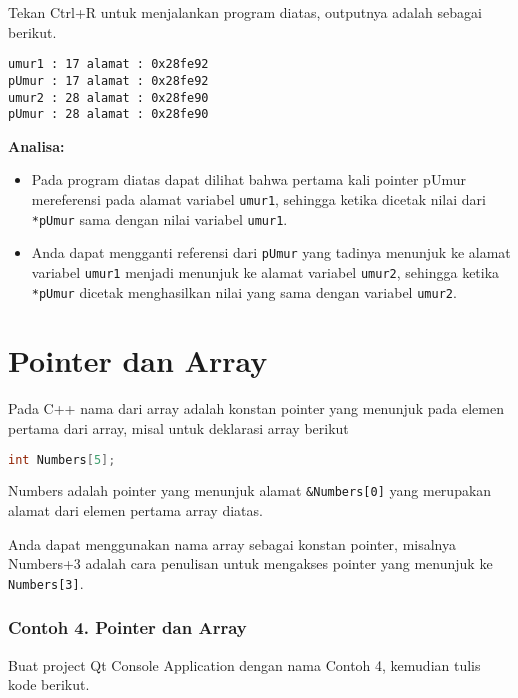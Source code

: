 Tekan Ctrl+R untuk menjalankan program diatas, outputnya adalah sebagai
berikut.

\begin{verbatim}
umur1 : 17 alamat : 0x28fe92
pUmur : 17 alamat : 0x28fe92
umur2 : 28 alamat : 0x28fe90
pUmur : 28 alamat : 0x28fe90
\end{verbatim}

\textbf{Analisa:}

\begin{itemize}
\tightlist
\item
  Pada program diatas dapat dilihat bahwa pertama kali pointer pUmur
  mereferensi pada alamat variabel \texttt{umur1}, sehingga ketika
  dicetak nilai dari \texttt{*pUmur} sama dengan nilai variabel
  \texttt{umur1}.
\item
  Anda dapat mengganti referensi dari \texttt{pUmur} yang tadinya
  menunjuk ke alamat variabel \texttt{umur1} menjadi menunjuk ke alamat
  variabel \texttt{umur2}, sehingga ketika \texttt{*pUmur} dicetak
  menghasilkan nilai yang sama dengan variabel \texttt{umur2}.
\end{itemize}

\section{Pointer dan Array}\label{pointer-dan-array}

Pada C++ nama dari array adalah konstan pointer yang menunjuk pada
elemen pertama dari array, misal untuk deklarasi array berikut

\begin{lstlisting}[language=c++]
int Numbers[5];
\end{lstlisting}

Numbers adalah pointer yang menunjuk alamat \texttt{\&Numbers{[}0{]}}
yang merupakan alamat dari elemen pertama array diatas.

Anda dapat menggunakan nama array sebagai konstan pointer, misalnya
Numbers+3 adalah cara penulisan untuk mengakses pointer yang menunjuk ke
\texttt{Numbers{[}3{]}}.

\subsubsection*{Contoh 4. Pointer dan Array}

Buat project Qt Console Application dengan nama Contoh 4, kemudian tulis
kode berikut.

